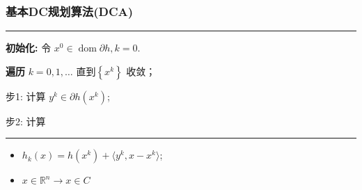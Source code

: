\documentclass{beamer}
\begin{document}
\begin{frame}
\frametitle{基本DC规划算法(DCA)}

\noindent
\rule{0.9\textwidth}{0.05em}

\textbf{初始化:} 令 $x^{0} \in \operatorname{dom} \partial h, k=0 .$

\textbf{遍历} $k=0,1, \ldots$ 直到$\left\{x^{k}\right\}$ 收敛；%
 
步1: 计算 $y^{k} \in \partial h\left(x^{k}\right)$;

步2: 计算
\begin{center}
 \end{center}
\noindent
\rule[-1pt]{0.9\textwidth}{0.05em}

\begin{itemize}
  \item $h_{k}(x) = h(x^k)+\langle y^k,x-x^k\rangle $;
  \item $x\in \mathbb{R}^n \rightarrow x \in C $
\end{itemize}


\end{frame}
\end{document}
